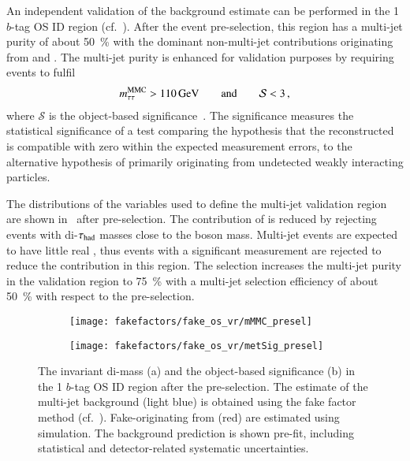 An independent validation of the background estimate can be performed
in the 1 $b$-tag OS ID region (cf.\ ).
After the event pre-selection, this region has a multi-jet purity of
about \SI{50}{\percent} with the dominant non-multi-jet contributions
originating from \Zjets and \ttbar. The multi-jet purity is enhanced
for validation purposes by requiring events to fulfil
\begin{align*}
  m_{\tau\tau}^\text{MMC} > \SI{110}{\ensuremath{\text{GeV}}} \qquad \text{and} \qquad \mathcal{S} < 3 \,\text{,}
\end{align*}
where $\mathcal{S}$ is the object-based \pTmissAbs
significance~\cite{ATLAS-CONF-2018-038}. The \pTmissAbs significance
measures the statistical significance of a test comparing the
hypothesis that the reconstructed \pTmissAbs is compatible with zero
within the expected measurement errors, to the alternative hypothesis
of \pTmissAbs primarily originating from undetected weakly interacting
particles.

The distributions of the variables used to define the multi-jet
validation region are shown in~
after pre-selection. The contribution of \Zjets is reduced by
rejecting events with di-$\tau_{\text{had}}$ masses close to the \PZ boson mass.
Multi-jet events are expected to have little real \pTmissAbs, thus
events with a significant \pTmissAbs measurement are rejected to
reduce the \ttbar contribution in this region. The selection increases
the multi-jet purity in the validation region to \SI{75}{\percent}
with a multi-jet selection efficiency of about \SI{50}{\percent} with
respect to the pre-selection.

\begin{figure}[htbp]
  \centering

  \begin{subfigure}{0.45\textwidth}
    \texttt{[image: fakefactors/fake\_os\_vr/mMMC\_presel]}
    \subcaption{}
  \end{subfigure}\hspace*{0.04\textwidth}%
  \begin{subfigure}{0.45\textwidth}
    \texttt{[image: fakefactors/fake\_os\_vr/metSig\_presel]}
    \subcaption{}
  \end{subfigure}

  \caption{The invariant di-\tauhad mass (a) and the object-based
    \pTmissAbs significance (b) in the 1 $b$-tag OS ID region after
    the pre-selection. The estimate of the multi-jet background (light
    blue) is obtained using the fake factor method (cf.\
    ). Fake-\tauhadvis originating from
    \ttbar (red) are estimated using simulation. The background
    prediction is shown pre-fit, including statistical and
    detector-related systematic uncertainties.}
  \label{fig:fake_factor_OSVR_cutvars}
\end{figure}

